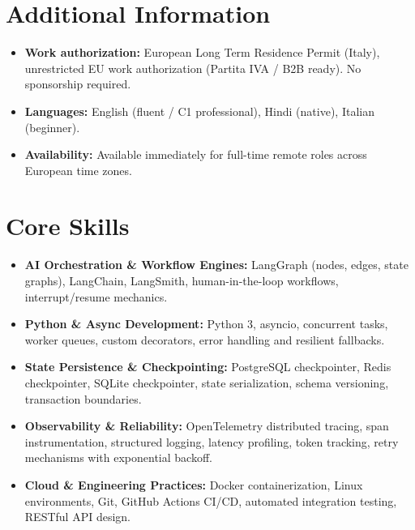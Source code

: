\documentclass[a4paper,10pt]{article}
\begin{document}
\section{Additional Information}
\begin{itemize}
 \item \textbf{Work authorization:} European Long Term Residence Permit (Italy), unrestricted EU work authorization (Partita IVA / B2B ready). No sponsorship required.
 \item \textbf{Languages:} English (fluent / C1 professional), Hindi (native), Italian (beginner).
 \item \textbf{Availability:} Available immediately for full-time remote roles across European time zones.
\end{itemize}

\section{Core Skills}
\begin{itemize}
 \item \textbf{AI Orchestration \& Workflow Engines:} LangGraph (nodes, edges, state graphs), LangChain, LangSmith, human-in-the-loop workflows, interrupt/resume mechanics.
 \item \textbf{Python \& Async Development:} Python 3, asyncio, concurrent tasks, worker queues, custom decorators, error handling and resilient fallbacks.
 \item \textbf{State Persistence \& Checkpointing:} PostgreSQL checkpointer, Redis checkpointer, SQLite checkpointer, state serialization, schema versioning, transaction boundaries.
 \item \textbf{Observability \& Reliability:} OpenTelemetry distributed tracing, span instrumentation, structured logging, latency profiling, token tracking, retry mechanisms with exponential backoff.
 \item \textbf{Cloud \& Engineering Practices:} Docker containerization, Linux environments, Git, GitHub Actions CI/CD, automated integration testing, RESTful API design.
\end{itemize}
\end{document}
